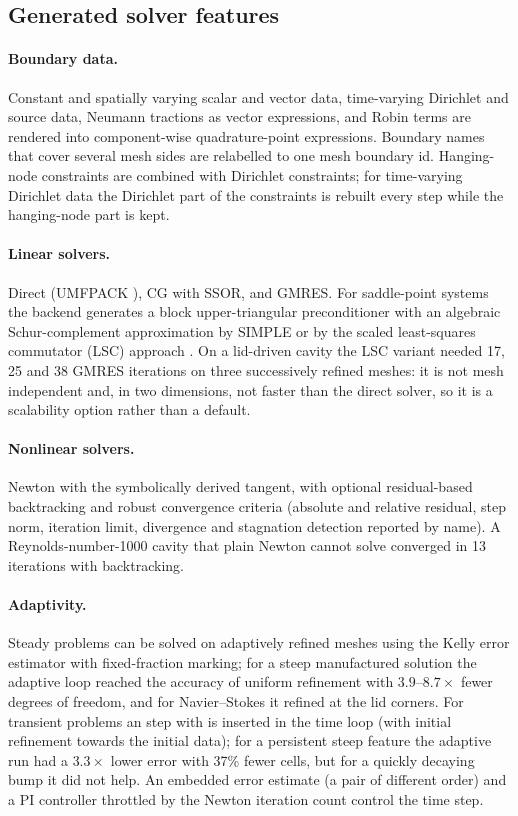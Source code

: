 \subsection{Generated solver features}
\paragraph{Boundary data.} Constant and spatially varying scalar and vector data, time-varying Dirichlet and source data, Neumann tractions as vector expressions, and Robin terms are rendered into component-wise quadrature-point expressions. Boundary names that cover several mesh sides are relabelled to one mesh boundary id. Hanging-node constraints are combined with Dirichlet constraints; for time-varying Dirichlet data the Dirichlet part of the constraints is rebuilt every step while the hanging-node part is kept.

\paragraph{Linear solvers.} Direct (UMFPACK \citep{davis2004}), CG with SSOR, and GMRES. For saddle-point systems the backend generates a block upper-triangular preconditioner with an algebraic Schur-complement approximation by SIMPLE \citep{patankar1972} or by the scaled least-squares commutator (LSC) approach \citep{elman2006}. On a lid-driven cavity the LSC variant needed 17, 25 and 38 GMRES iterations on three successively refined meshes: it is not mesh independent and, in two dimensions, not faster than the direct solver, so it is a scalability option rather than a default.

\paragraph{Nonlinear solvers.} Newton with the symbolically derived tangent, with optional residual-based backtracking and robust convergence criteria (absolute and relative residual, step norm, iteration limit, divergence and stagnation detection reported by name). A Reynolds-number-1000 cavity that plain Newton cannot solve converged in 13 iterations with backtracking.

\paragraph{Adaptivity.} Steady problems can be solved on adaptively refined meshes using the Kelly error estimator \citep{kelly1983} with fixed-fraction marking; for a steep manufactured solution the adaptive loop reached the accuracy of uniform refinement with $3.9$--$8.7\times$ fewer degrees of freedom, and for Navier--Stokes it refined at the lid corners. For transient problems an  step with  is inserted in the time loop (with initial refinement towards the initial data); for a persistent steep feature the adaptive run had a $3.3\times$ lower error with 37\% fewer cells, but for a quickly decaying bump it did not help. An embedded error estimate (a pair of different order) and a PI controller throttled by the Newton iteration count control the time step.

